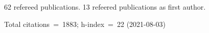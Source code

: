 62 refereed publications. 13 refeered publications as first author.

Total citations~=~1883; h-index~=~22 (2021-08-03)